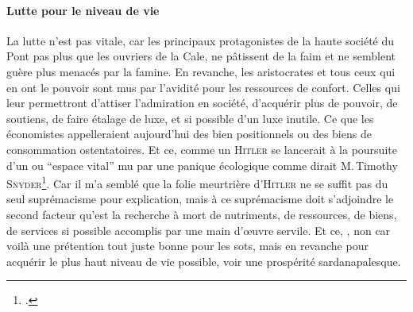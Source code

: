 \paragraph{Lutte pour le niveau de vie}
La lutte n’est pas vitale, car les principaux protagonistes de la haute société du Pont pas plus que les ouvriers de la Cale, ne pâtissent de  la faim et ne semblent guère plus menacés par la famine. En revanche, les aristocrates et tous ceux qui en ont le pouvoir sont mus par l’avidité pour les ressources de confort. Celles qui leur permettront d’attiser l’admiration en société, d’acquérir plus de pouvoir, de soutiens, de faire étalage de luxe, et si possible d’un luxe inutile. Ce que les économistes appelleraient aujourd’hui des bien positionnels ou des biens de consommation ostentatoires. Et ce, comme un \textsc{Hitler} se lancerait à la poursuite d’un  ou \enquote{espace vital} mu par une panique écologique comme dirait M.\,Timothy \textsc{Snyder}\footcite{timothySnyder2016Gallimard-TerreNoire}. Car il m’a semblé que la folie meurtrière d’\textsc{Hitler} ne se suffit pas du seul suprémacisme pour explication, mais à ce suprémacisme  doit s’adjoindre le second facteur qu’est la recherche à mort de nutriments, de ressources, de biens, de services si possible accomplis par une main d’œuvre servile. Et ce, , non car voilà une prétention tout juste bonne pour les sots, mais en revanche pour acquérir le plus haut niveau de vie possible, voir une prospérité sardanapalesque.


